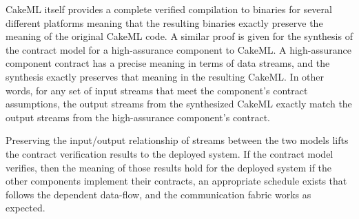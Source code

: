 CakeML itself provides a complete verified compilation to binaries for several different platforms meaning that the resulting binaries exactly preserve the meaning of the original CakeML code. A similar proof is given for the synthesis of the contract model for a high-assurance component to CakeML. A high-assurance component contract has a precise meaning in terms of data streams, and the synthesis exactly preserves that meaning in the resulting CakeML. In other words, for any set of input streams that meet the component's contract assumptions, the output streams from the synthesized CakeML exactly match the output streams from the high-assurance component's contract. 

Preserving the input/output relationship of streams between the two models lifts the contract verification results to the deployed system. If the contract model verifies, then the meaning of those results hold for the deployed system if the other components implement their contracts, an appropriate schedule exists that follows the dependent data-flow, and the communication fabric works as expected.
